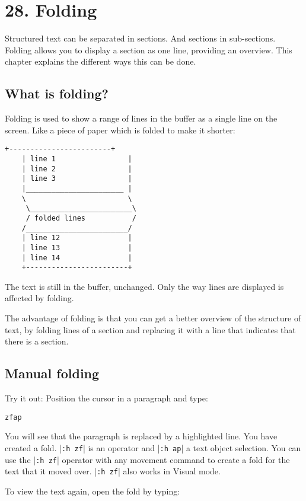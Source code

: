 \section{28. Folding}
Structured text can be separated in sections.  And sections in sub-sections.
Folding allows you to display a section as one line, providing an overview.
This chapter explains the different ways this can be done.
\subsection{What is folding?}
Folding is used to show a range of lines in the buffer as a single line on the screen.
Like a piece of paper which is folded to make it shorter:

\begin{Verbatim}[samepage=true]
    +------------------------+
    | line 1                 |
    | line 2                 |
    | line 3                 |
    |_______________________ |
    \                        \
     \________________________\
     / folded lines           /
    /________________________/
    | line 12                |
    | line 13                |
    | line 14                |
    +------------------------+
\end{Verbatim}

The text is still in the buffer, unchanged.
Only the way lines are displayed is affected by folding.

The advantage of folding is that you can get a better overview of the structure of text, by folding lines of a section and replacing it with a line that indicates that there is a section.
\subsection{Manual folding}
Try it out: Position the cursor in a paragraph and type:

\begin{Verbatim}[samepage=true]
 zfap
\end{Verbatim}

You will see that the paragraph is replaced by a highlighted line.
You have created a fold.
|\verb!:h zf!| is an operator and |\verb!:h ap!| a text object selection.
You can use the |\verb!:h zf!| operator with any movement command to create a fold for the text that it moved over.
|\verb!:h zf!| also works in Visual mode.

To view the text again, open the fold by typing:


